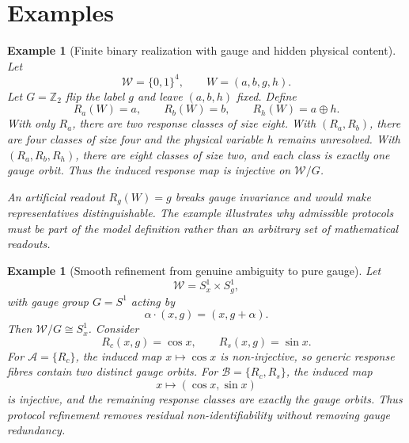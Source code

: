 \documentclass[11pt]{article}
\newtheorem{example}[definition]{Example}
\newcommand{\W}{\mathcal W}
\newcommand{\Acal}{\mathcal A}
\newcommand{\Bcal}{\mathcal B}
\begin{document}
\section{Examples}

\begin{example}[Finite binary realization with gauge and hidden physical content]
Let
\[
\W=\{0,1\}^4,
\qquad
W=(a,b,g,h).
\]
Let $G=\mathbb Z_2$ flip the label $g$ and leave $(a,b,h)$ fixed. Define
\[
R_a(W)=a,
\qquad
R_b(W)=b,
\qquad
R_h(W)=a\oplus h.
\]
With only $R_a$, there are two response classes of size eight. With
$(R_a,R_b)$, there are four classes of size four and the physical variable $h$
remains unresolved. With $(R_a,R_b,R_h)$, there are eight classes of size two,
and each class is exactly one gauge orbit. Thus the induced response map is
injective on $\W/G$.

An artificial readout $R_g(W)=g$ breaks gauge invariance and would make
representatives distinguishable. The example illustrates why admissible
protocols must be part of the model definition rather than an arbitrary set of
mathematical readouts.
\end{example}

\begin{example}[Smooth refinement from genuine ambiguity to pure gauge]
Let
\[
\W=S^1_x\times S^1_g,
\]
with gauge group $G=S^1$ acting by
\[
\alpha\cdot(x,g)=(x,g+\alpha).
\]
Then $\W/G\cong S^1_x$. Consider
\[
R_c(x,g)=\cos x,
\qquad
R_s(x,g)=\sin x.
\]
For $\Acal=\{R_c\}$, the induced map
$x\mapsto\cos x$ is non-injective, so generic response fibres contain two
distinct gauge orbits. For
$\Bcal=\{R_c,R_s\}$, the induced map
\[
x\mapsto(\cos x,\sin x)
\]
is injective, and the remaining response classes are exactly the gauge orbits.
Thus protocol refinement removes residual non-identifiability without removing
gauge redundancy.
\end{example}
\end{document}
